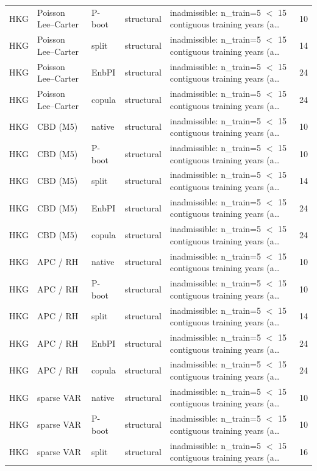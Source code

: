 {\begin{longtable}{@{}lllp{1.6cm}p{6.2cm}r@{}}
HKG & Poisson Lee--Carter & P-boot & structural & inadmissible: n\_train=5 $<$ 15 contiguous training years (a\ldots & 10 \\
HKG & Poisson Lee--Carter & split & structural & inadmissible: n\_train=5 $<$ 15 contiguous training years (a\ldots & 14 \\
HKG & Poisson Lee--Carter & EnbPI & structural & inadmissible: n\_train=5 $<$ 15 contiguous training years (a\ldots & 24 \\
HKG & Poisson Lee--Carter & copula & structural & inadmissible: n\_train=5 $<$ 15 contiguous training years (a\ldots & 24 \\
HKG & CBD (M5) & native & structural & inadmissible: n\_train=5 $<$ 15 contiguous training years (a\ldots & 10 \\
HKG & CBD (M5) & P-boot & structural & inadmissible: n\_train=5 $<$ 15 contiguous training years (a\ldots & 10 \\
HKG & CBD (M5) & split & structural & inadmissible: n\_train=5 $<$ 15 contiguous training years (a\ldots & 14 \\
HKG & CBD (M5) & EnbPI & structural & inadmissible: n\_train=5 $<$ 15 contiguous training years (a\ldots & 24 \\
HKG & CBD (M5) & copula & structural & inadmissible: n\_train=5 $<$ 15 contiguous training years (a\ldots & 24 \\
HKG & APC / RH & native & structural & inadmissible: n\_train=5 $<$ 15 contiguous training years (a\ldots & 10 \\
HKG & APC / RH & P-boot & structural & inadmissible: n\_train=5 $<$ 15 contiguous training years (a\ldots & 10 \\
HKG & APC / RH & split & structural & inadmissible: n\_train=5 $<$ 15 contiguous training years (a\ldots & 14 \\
HKG & APC / RH & EnbPI & structural & inadmissible: n\_train=5 $<$ 15 contiguous training years (a\ldots & 24 \\
HKG & APC / RH & copula & structural & inadmissible: n\_train=5 $<$ 15 contiguous training years (a\ldots & 24 \\
HKG & sparse VAR & native & structural & inadmissible: n\_train=5 $<$ 15 contiguous training years (a\ldots & 10 \\
HKG & sparse VAR & P-boot & structural & inadmissible: n\_train=5 $<$ 15 contiguous training years (a\ldots & 10 \\
HKG & sparse VAR & split & structural & inadmissible: n\_train=5 $<$ 15 contiguous training years (a\ldots & 16 \\

\end{longtable}}
